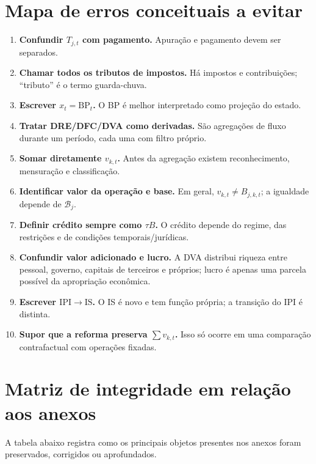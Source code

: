 \documentclass[11pt,a4paper]{article}
\newcommand{\BP}{\mathrm{BP}}
\newcommand{\IPI}{\mathrm{IPI}}
\newcommand{\IS}{\mathrm{IS}}
\newcommand{\cB}{\mathcal{B}}
\begin{document}
\section{Mapa de erros conceituais a evitar}

\begin{enumerate}
    \item \textbf{Confundir $T_{j,t}$ com pagamento.} Apuração e pagamento devem ser separados.
    \item \textbf{Chamar todos os tributos de impostos.} Há impostos e contribuições; ``tributo'' é o termo guarda-chuva.
    \item \textbf{Escrever $x_t=\BP_t$.} O BP é melhor interpretado como projeção do estado.
    \item \textbf{Tratar DRE/DFC/DVA como derivadas.} São agregações de fluxo durante um período, cada uma com filtro próprio.
    \item \textbf{Somar diretamente $v_{k,t}$.} Antes da agregação existem reconhecimento, mensuração e classificação.
    \item \textbf{Identificar valor da operação e base.} Em geral, $v_{k,t}\neq B_{j,k,t}$; a igualdade depende de $\cB_j$.
    \item \textbf{Definir crédito sempre como $\tau B$.} O crédito depende do regime, das restrições e de condições temporais/jurídicas.
    \item \textbf{Confundir valor adicionado e lucro.} A DVA distribui riqueza entre pessoal, governo, capitais de terceiros e próprios; lucro é apenas uma parcela possível da apropriação econômica.
    \item \textbf{Escrever $\IPI\to\IS$.} O IS é novo e tem função própria; a transição do IPI é distinta.
    \item \textbf{Supor que a reforma preserva $\sum v_{k,t}$.} Isso só ocorre em uma comparação contrafactual com operações fixadas.
\end{enumerate}

\appendix
\section{Matriz de integridade em relação aos anexos}

A tabela abaixo registra como os principais objetos presentes nos anexos foram preservados, corrigidos ou aprofundados.
\end{document}
